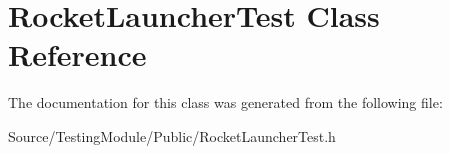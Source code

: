 \hypertarget{class_rocket_launcher_test}{}\section{Rocket\+Launcher\+Test Class Reference}
\label{class_rocket_launcher_test}


The documentation for this class was generated from the following file\+:\begin{DoxyCompactItemize}
\item 
Source/\+Testing\+Module/\+Public/Rocket\+Launcher\+Test.\+h\end{DoxyCompactItemize}
